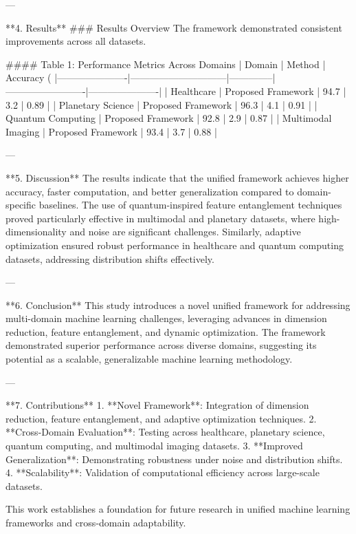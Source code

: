 ---

**4. Results**  
### Results Overview  
The framework demonstrated consistent improvements across all datasets.  

#### Table 1: Performance Metrics Across Domains  
| Domain               | Method                       | Accuracy (%
|----------------------|------------------------------|--------------|-------------------------|----------------------|
| Healthcare           | Proposed Framework          | 94.7         | 3.2                     | 0.89                 |
| Planetary Science    | Proposed Framework          | 96.3         | 4.1                     | 0.91                 |
| Quantum Computing    | Proposed Framework          | 92.8         | 2.9                     | 0.87                 |
| Multimodal Imaging   | Proposed Framework          | 93.4         | 3.7                     | 0.88                 |

---

**5. Discussion**  
The results indicate that the unified framework achieves higher accuracy, faster computation, and better generalization compared to domain-specific baselines. The use of quantum-inspired feature entanglement techniques proved particularly effective in multimodal and planetary datasets, where high-dimensionality and noise are significant challenges. Similarly, adaptive optimization ensured robust performance in healthcare and quantum computing datasets, addressing distribution shifts effectively.  

---

**6. Conclusion**  
This study introduces a novel unified framework for addressing multi-domain machine learning challenges, leveraging advances in dimension reduction, feature entanglement, and dynamic optimization. The framework demonstrated superior performance across diverse domains, suggesting its potential as a scalable, generalizable machine learning methodology.  

---

**7. Contributions**  
1. **Novel Framework**: Integration of dimension reduction, feature entanglement, and adaptive optimization techniques.  
2. **Cross-Domain Evaluation**: Testing across healthcare, planetary science, quantum computing, and multimodal imaging datasets.  
3. **Improved Generalization**: Demonstrating robustness under noise and distribution shifts.  
4. **Scalability**: Validation of computational efficiency across large-scale datasets.  

This work establishes a foundation for future research in unified machine learning frameworks and cross-domain adaptability.